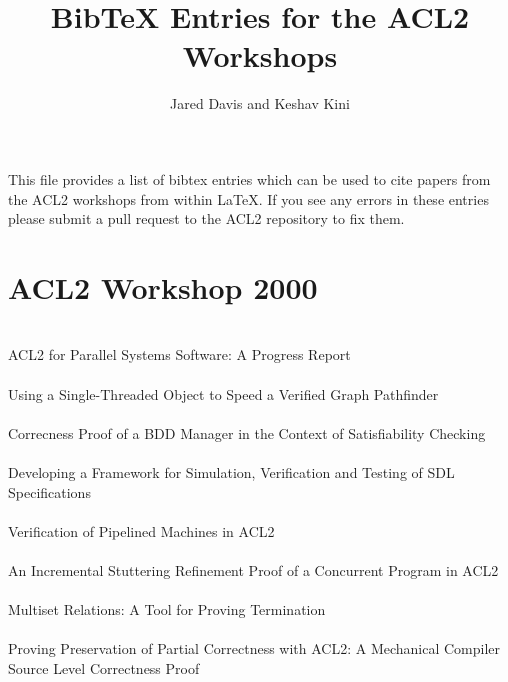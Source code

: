 \documentclass{article}
\title{BibTeX Entries for the ACL2 Workshops}
\author{Jared Davis and Keshav Kini}
\begin{document}
\maketitle

This file provides a list of bibtex entries which can be used to cite papers
from the ACL2 workshops from within \LaTeX{}.  If you see any errors in these
entries please submit a pull request to the ACL2 repository to fix them.


\section{ACL2 Workshop 2000}

\cite{00-lusk-parallel} \\
ACL2 for Parallel Systems Software: A Progress Report \\

\cite{00-wilding-stobj} \\
Using a Single-Threaded Object to Speed a Verified Graph Pathfinder \\

\cite{00-sumners-bdds} \\
Correcness Proof of a BDD Manager in the Context of Satisfiability Checking \\

\cite{00-shumsky-sdl} \\
Developing a Framework for Simulation, Verification and Testing of SDL Specifications \\

\cite{00-manolios-pipeline} \\
Verification of Pipelined Machines in ACL2 \\

\cite{00-sumners-stuttering} \\
An Incremental Stuttering Refinement Proof of a Concurrent Program in ACL2 \\

\cite{00-reina-multiset} \\
Multiset Relations: A Tool for Proving Termination \\

\cite{00-goerigk} \\
Proving Preservation of Partial Correctness with ACL2: A Mechanical Compiler Source Level Correctness Proof \\
\end{document}
